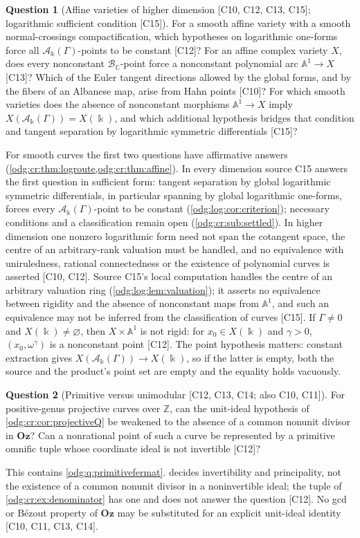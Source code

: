 \documentclass[11pt,oneside]{article}
\numberwithin{equation}{section}
\theoremstyle{definition}
\newtheorem{question}[question]{Question}
\theoremstyle{remark}
\newcommand{\Oz}{\mathbf{Oz}}
\newcommand{\Z}{\mathbb Z}
\newcommand{\C}{\mathbb C}
\newcommand{\BC}{\mathcal B_{\C}}
\newcommand{\src}[1]{\textup{\textsf{\small[#1]}}}
\newcommand{\crA}{\mathcal A_\Bbbk(\Gamma)}
\newcommand{\Aff}{\mathbb A}
\begin{document}
\begin{question}[Affine varieties of higher dimension \src{C10, C12, C13, C15}; logarithmic sufficient condition \src{C15}]\label{odg:cr:q:higher}
For a smooth affine variety with a smooth normal-crossings compactification, which
hypotheses on logarithmic one-forms force all $\crA$-points to be constant
\src{C12}? For an affine complex variety $X$, does every nonconstant $\BC$-point force
a nonconstant polynomial arc $\Aff^1\to X$ \src{C13}? Which of the Euler tangent
directions allowed by the global forms, and by the fibers of an Albanese map, arise
from Hahn points \src{C10}? For which smooth varieties does the absence of nonconstant
morphisms $\Aff^1\to X$ imply $X(\crA)=X(\Bbbk)$, and which additional hypothesis bridges
that condition and tangent separation by logarithmic symmetric differentials \src{C15}?
\end{question}
For smooth curves the first two questions have affirmative answers
(\cref{odg:cr:thm:logroute,odg:cr:thm:affine}). In every dimension source C15 answers the
first question in sufficient form: tangent separation by global logarithmic symmetric
differentials, in particular spanning by global logarithmic one-forms, forces every
$\crA$-point to be constant (\cref{odg:log:cor:criterion}); necessary conditions and a
classification remain open (\cref{odg:cr:sub:settled}).
In higher dimension one nonzero logarithmic form need not span the cotangent space,
the centre of an arbitrary-rank valuation must be handled, and no equivalence with
uniruledness, rational connectedness or the existence of polynomial curves is
asserted \src{C10, C12}. Source C15's local computation handles the centre of an
arbitrary valuation ring (\cref{odg:log:lem:valuation}); it asserts no equivalence
between rigidity and the absence of nonconstant maps from $\Aff^1$, and such an
equivalence may not be inferred from the classification of curves \src{C15}. If $\Gamma\ne0$ and $X(\Bbbk)\ne\varnothing$, then
$X\times\Aff^1$ is not rigid: for $x_0\in X(\Bbbk)$ and $\gamma>0$,
$(x_0,\omega^\gamma)$ is a nonconstant point \src{C12}.
The point hypothesis matters: constant extraction gives
$X(\crA)\to X(\Bbbk)$, so if the latter is empty, both the source
and the product's point set are empty and the equality holds vacuously.

\begin{question}[Primitive versus unimodular \src{C12, C13, C14; also C10, C11}]\label{odg:cr:q:primitive}
For positive-genus projective curves over $\Z$, can the unit-ideal hypothesis of
\cref{odg:cr:cor:projectiveQ} be weakened to the absence of a common nonunit divisor in
$\Oz$? Can a nonrational point of such a curve be represented by a primitive omnific
tuple whose coordinate ideal is not invertible \src{C12}?
\end{question}
This contains \cref{odg:q:primitivefermat}.  decides
invertibility and principality, not the existence of a common nonunit divisor in a
noninvertible ideal; the tuple of \cref{odg:cr:ex:denominator} has one and does not
answer the question \src{C12}. No gcd or B\'ezout property of $\Oz$ may be substituted
for an explicit unit-ideal identity \src{C10, C11, C13, C14}.
\end{document}
